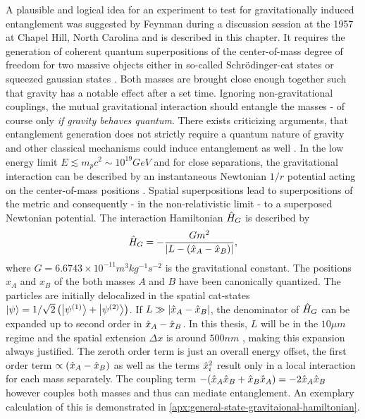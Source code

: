 A plausible and logical idea for an experiment to test for gravitationally induced entanglement was suggested by Feynman during a discussion session at the 1957  at Chapel Hill, North Carolina \cite[p. 247-260]{Rickles_2011} and is described in this chapter.
It requires the generation of coherent quantum superpositions of the center-of-mass degree of freedom for two massive objects either in so-called Schrödinger-cat states or squeezed gaussian states \cite{Bose_2017, Pedernales_2023}.
Both masses are brought close enough together such that gravity has a notable effect after a set time.
Ignoring non-gravitational couplings, the mutual gravitational interaction should entangle the masses - of course only \textit{if gravity behaves quantum}.
There exists criticizing arguments, that entanglement generation does not strictly require a quantum nature of gravity and other classical mechanisms could induce entanglement as well \cite{Reginatto_2019}.
In the low energy limit $E\lesssim m_p c^2 \sim 10^{19}\si{GeV}$ and for close separations, the gravitational interaction can be described by an instantaneous Newtonian $1/r$ potential acting on the center-of-mass positions \cite{Carney_2018,Pedernales_2023,Christodoulou_2022}.
Spatial superpositions lead to superpositions of the metric and consequently - in the non-relativistic limit - to a superposed Newtonian potential.
The interaction Hamiltonian $\hat{H}_G$ is described by
\begin{equation}\label{eq:2:gravity-hamiltonian}
  \hat{H}_G = - \frac{Gm^2}{\left\lvert L - (\hat{x}_A - \hat{x}_B)\right\rvert} ,
\end{equation}
where $G=6.6743 \times 10^{-11} \si{m^3 kg^{-1} s^{-2}}$ is the gravitational constant. 
The positions $x_A$ and $x_B$ of the both masses $A$ and $B$ have been canonically quantized. The particles are initially delocalized in the spatial cat-states $\ket{\psi} = 1/\sqrt{2}\left(\ket{\psi^{(1)}} + \ket{\psi^{(2)}}\right)$.
If $L \gg \left\lvert\hat{x}_A - \hat{x}_B\right\rvert$, the denominator of $\hat{H}_G$ can be expanded up to second order in $\hat{x}_A - \hat{x}_B$. In this thesis, $L$ will be in the $10\si{\mu m}$ regime and the spatial extension $\Delta x$ is around $500\si{nm}$ \cite{Fein_2019}, making this expansion always justified.
The zeroth order term is just an overall energy offset, the first order term $\propto (\hat{x}_A - \hat{x}_B)$ as well as the terms $\hat{x}^2_i$ result only in a local interaction for each mass separately. The coupling term $ - (\hat{x}_A\hat{x}_B + \hat{x}_B\hat{x}_A) = -2\hat{x}_A\hat{x}_B$ however couples both masses and thus can mediate entanglement. An exemplary calculation of this is demonstrated in \cref{apx:general-state-gravitaional-hamiltonian}.

